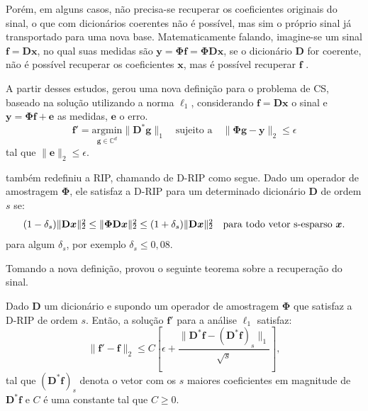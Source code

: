 \documentclass[cic,tc]{iiufrgs}
\def\SPSB#1#2{\rlap{\textsuperscript{#1}}\SB{#2}}
\def\SB#1{\textsubscript{#1}}
\renewcommand{\vec}[1]{\bm{#1}}
\begin{document}
Porém, em alguns casos, não precisa-se recuperar os coeficientes originais do sinal, o que com dicionários 
coerentes não é possível, mas sim o próprio sinal já transportado para uma nova base.
Matematicamente falando, imagine-se um sinal $\vec{f} = \mathbf{D}\vec{x}$, no qual suas medidas são
$\vec{y} = \mathbf{\Phi}\vec{f} = \mathbf{\Phi}\mathbf{D}\vec{x}$, se o dicionário $\mathbf{D}$ for
coerente, não é possível recuperar os coeficientes $\vec{x}$, mas é possível recuperar $\vec{f}$ \cite{CANDESDICTS}.

A partir desses estudos, \citet{CANDESDICTS} gerou uma nova definição para o problema de CS, 
baseado na solução utilizando a norma $\ell_1$, considerando $\vec{f} = \mathbf{D}\vec{x}$ o sinal
e $\vec{y} = \mathbf{\Phi}\vec{f} + \vec{e}$ as medidas, $\vec{e}$ o erro.
\begin{equation}
    \label{eq:problemDl1}
    \vec{f'} = \underset{\vec{g} \in \mathbb{C}^d}{\text{argmin}} \lVert \mathbf{D}^*\vec{g} \rVert_1 
    \hspace{1em} \text{sujeito a} \hspace{1em}
    \lVert \mathbf{\Phi} \vec{g} - \vec{y} \rVert_2 \le \epsilon
\end{equation}
tal que $\lVert \vec{e} \rVert_2 \le \epsilon $.

\citet{CANDESDICTS} também redefiniu a RIP, chamando de D-RIP como segue. 
Dado um operador de amostragem $\mathbf{\Phi}$, ele satisfaz a D-RIP para um determinado 
dicionário $\mathbf{D}$ de ordem $s$ se:
\begin{equation}
    (1 - \delta_s)\lVert \mathbf{D}\vec{x} \rVert\SPSB{2}{2} \le \lVert \mathbf{\Phi} \mathbf{D}\vec{x} \rVert \SPSB{2}{2} \le 
    (1 + \delta_s)\lVert \mathbf{D}\vec{x} \rVert\SPSB{2}{2} \hspace{1em} \text{para todo vetor s-esparso } \vec{x}.
\end{equation}
para algum $\delta_s$, por exemplo $\delta_s \le 0,08$.

Tomando a nova definição, \citet{CANDESDICTS} provou o seguinte teorema sobre a recuperação do sinal.
\begin{teorema}
    \cite{CANDESDICTS}
    Dado $\mathbf{D}$ um dicionário e supondo um operador de amostragem $\mathbf{\Phi}$ que satisfaz
    a D-RIP de ordem $s$.
    Então, a solução $\vec{f'}$ para a análise $\ell_1$ satisfaz:
    \begin{equation*}
        \lVert \vec{f'} - \vec{f} \rVert_2 \le C \left[ \epsilon + \frac{\lVert \mathbf{D}^* \vec{f} - \left( \mathbf{D}^* \vec{f} \right)_s \rVert_1}{\sqrt{s}} \right],
    \end{equation*}
    tal que $\left( \mathbf{D}^* \vec{f} \right)_s$ denota o vetor com os $s$ maiores coeficientes em 
    magnitude de $\mathbf{D}^* \vec{f}$ e $C$ é uma constante tal que $C \ge 0$.
\end{teorema}
\end{document}
